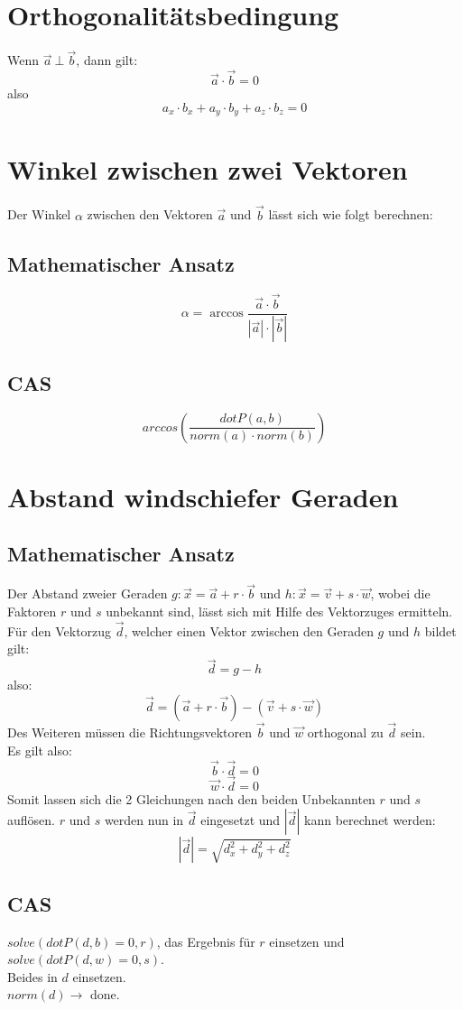 \documentclass[a4paper,12pt]{article}
\begin{document}
\section{Orthogonalitätsbedingung}
Wenn $\vec{a}\ \bot\ \vec{b}$, dann gilt:
$$\vec{a} \cdot \vec{b} = 0$$
also
$$a_x \cdot b_x + a_y \cdot b_y + a_z \cdot b_z = 0$$
\section{Winkel zwischen zwei Vektoren}
Der Winkel $\alpha$ zwischen den Vektoren $\vec{a}$ und $\vec{b}$ lässt sich wie folgt berechnen:
\subsection{Mathematischer Ansatz}
$$\alpha = \arccos{\frac{\vec{a} \cdot \vec{b}}{|\vec{a}| \cdot |\vec{b}|}}$$
\subsection{CAS}
$$arccos(\frac{dotP(a, b)}{norm(a) \cdot norm(b)})$$
\pagebreak
\section{Abstand windschiefer Geraden}
\subsection{Mathematischer Ansatz}
Der Abstand zweier Geraden $g : \vec{x} = \vec{a} + r \cdot \vec{b}$ und $h : \vec{x} = \vec{v} + s \cdot \vec{w}$, wobei die Faktoren $r$ und $s$ unbekannt sind, lässt sich mit Hilfe des Vektorzuges ermitteln.\\
Für den Vektorzug $\vec{d}$, welcher einen Vektor zwischen den Geraden $g$ und $h$ bildet gilt:
$$\vec{d} = g - h$$
also:
$$\vec{d} = (\vec{a} + r \cdot \vec{b}) - (\vec{v} + s \cdot \vec{w})$$
Des Weiteren müssen die Richtungsvektoren $\vec{b}$ und $\vec{w}$ orthogonal zu $\vec{d}$ sein.\\
Es gilt also:
$$\vec{b} \cdot \vec{d} = 0$$
$$\vec{w} \cdot \vec{d} = 0$$
Somit lassen sich die 2 Gleichungen nach den beiden Unbekannten $r$ und $s$ auflösen.
$r$ und $s$ werden nun in $\vec{d}$ eingesetzt und $|\vec{d}|$ kann berechnet werden:
$$|\vec{d}| = \sqrt{d_{x}^{2} + d_{y}^{2} + d_{z}^{2}}$$
\subsection{CAS}
$solve(dotP(d,b) = 0,r)$, das Ergebnis für $r$ einsetzen und\\
$solve(dotP(d,w) = 0,s)$.\\
Beides in $d$ einsetzen.\\
$norm(d) \rightarrow$ done.
\pagebreak
\end{document}
